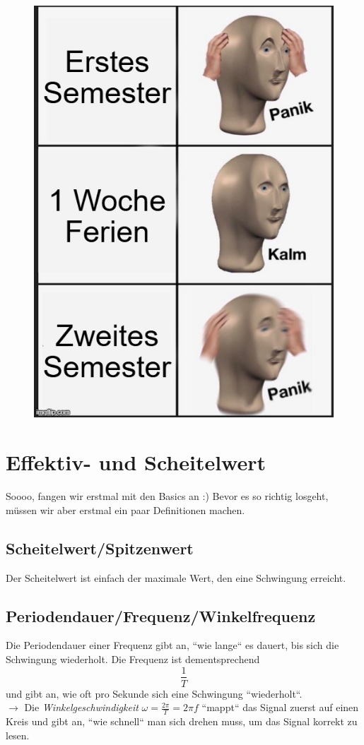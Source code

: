 \documentclass[11pt,a4paper]{article}
\begin{document}
\begin{figure}[h]
\begin{minipage}{0.3\textwidth}
        \includegraphics[width=\textwidth]{memes/meme3.jpg}
    \end{minipage}
\end{figure}

\newpage
\raggedright
\section{Effektiv- und Scheitelwert}
Soooo, fangen wir erstmal mit den Basics an :) Bevor es so richtig losgeht, müssen wir aber erstmal ein paar Definitionen machen.

\subsection{Scheitelwert/Spitzenwert}
Der Scheitelwert ist einfach der maximale Wert, den eine Schwingung erreicht.

\subsection{Periodendauer/Frequenz/Winkelfrequenz}
Die Periodendauer einer Frequenz gibt an, ``wie lange`` es dauert, bis sich die Schwingung wiederholt. Die Frequenz ist dementsprechend
\[
\frac{1}{T}
\]
und gibt an, wie oft pro Sekunde sich eine Schwingung ``wiederholt``. \\
\( \rightarrow \) Die \textit{Winkelgeschwindigkeit} \( \omega=\frac{2\pi}{T} = 2\pi f \) ``mappt`` das Signal zuerst auf einen Kreis und gibt an, ``wie schnell`` man sich drehen muss, um das Signal korrekt zu lesen.
\end{document}
